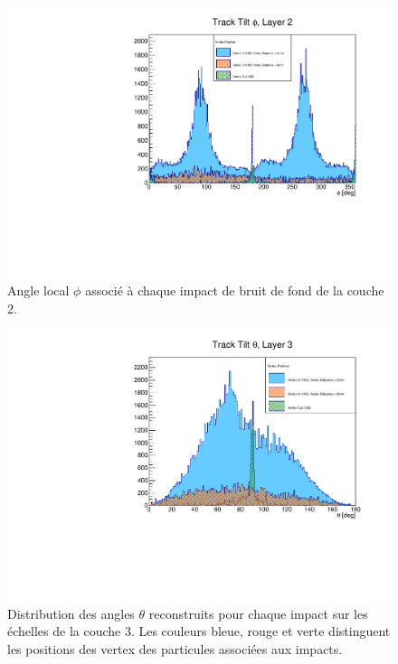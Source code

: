 \begin{appendices}
  \begin{figure}[!htb]
    \centering
    \includegraphics[scale=0.58]{./figures/Track_Tilts_Beamstrahlung/beamstrahlung_Phi/Track_Tilts_Phi_Layer2.pdf}
    \caption{Angle local $\phi$ associ\'e \`a chaque impact de bruit de fond de la couche 2.}
    \label{fig:phi_Layer2}
  \end{figure}
  
  \begin{figure}[!htb]
    \centering
    \includegraphics[scale=0.58]{./figures/Track_Tilts_Beamstrahlung/beamstrahlung_Theta/Track_Tilts_Theta_Layer3.pdf}
    \caption{Distribution des angles $\theta$ reconstruits pour chaque impact sur les \'echelles de la couche 3. Les couleurs bleue, rouge et verte distinguent les positions des vertex des particules associ\'ees aux impacts.}
    \label{fig:theta_Layer3}
  \end{figure}
  

\end{appendices}
